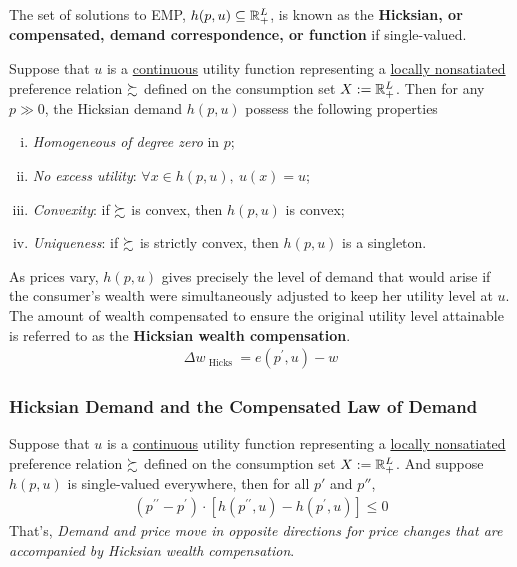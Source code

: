 \documentclass{article}
\begin{document}
 			\begin{definition}
 				The set of solutions to EMP, $h(p, u) \subseteq \mathbb{R}^L_+$, is known as the \textbf{Hicksian, or compensated, demand correspondence, or function} if single-valued.
 			\end{definition}
 			
 			\begin{proposition}[3.E.3]
 				Suppose that $u$ is a \ul{continuous} utility function representing a \ul{locally nonsatiated} preference relation $\succsim$ defined on the consumption set $X := \mathbb{R}^L_+$. Then for any $p \gg 0$, the Hicksian demand $h(p, u)$ possess the following properties
 				\begin{enumerate}[(i)]
 					\item \emph{Homogeneous of degree zero} in $p$;
 					\item \emph{No excess utility}: $\forall x \in h(p, u),\ u(x) = u$;
 					\item \emph{Convexity}: if $\succsim$ is convex, then $h(p, u)$ is convex;
 					\item \emph{Uniqueness}: if $\succsim$ is strictly convex, then $h(p, u)$ is a singleton.
 				\end{enumerate}
 			\end{proposition}
 			
 			\begin{definition}
 				As prices vary, $h(p, u)$ gives precisely the level of demand that would arise if the consumer's wealth were simultaneously adjusted to keep her utility level at $u$. The amount of wealth compensated to ensure the original utility level attainable is referred to as the \textbf{Hicksian wealth compensation}.
 				\begin{align}
 					\Delta w_{\text { Hicks }}=e\left(p^{\prime}, u\right)-w
 				\end{align}
 			\end{definition}
 			
 			\subsubsection{Hicksian Demand and the Compensated Law of Demand}
 			
 			\begin{proposition}
 				Suppose that $u$ is a \ul{continuous} utility function representing a \ul{locally nonsatiated} preference relation $\succsim$ defined on the consumption set $X := \mathbb{R}^L_+$. And suppose $h(p, u)$ is single-valued everywhere, then for all $p'$ and $p''$,
 				\begin{align}
 					\left(p^{\prime \prime}-p^{\prime}\right) \cdot\left[h\left(p^{\prime \prime}, u\right)-h\left(p^{\prime}, u\right)\right] \leq 0
 				\end{align}
 				That's, \emph{Demand and price move in opposite directions for price changes that are accompanied by Hicksian wealth compensation}.
 			\end{proposition}
 			
\end{document}
